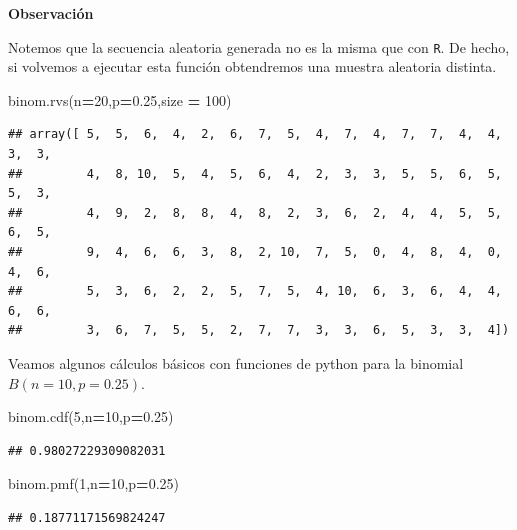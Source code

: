 \documentclass[]{book}
\newenvironment{Shaded}{\begin{snugshade}}{\end{snugshade}}
\newcommand{\DecValTok}[1]{\textcolor[rgb]{0.00,0.00,0.81}{#1}}
\newcommand{\FloatTok}[1]{\textcolor[rgb]{0.00,0.00,0.81}{#1}}
\newcommand{\NormalTok}[1]{#1}
\newcommand{\OperatorTok}[1]{\textcolor[rgb]{0.81,0.36,0.00}{\textbf{#1}}}
\begin{document}
 \textbf{Observación}

Notemos que la secuencia aleatoria generada no es la misma que con \texttt{R}. De hecho, si volvemos a ejecutar esta función obtendremos una muestra aleatoria distinta.

\begin{Shaded}
\begin{Highlighting}[]
\NormalTok{binom.rvs(n}\OperatorTok{=}\DecValTok{20}\NormalTok{,p}\OperatorTok{=}\FloatTok{0.25}\NormalTok{,size }\OperatorTok{=} \DecValTok{100}\NormalTok{)}
\end{Highlighting}
\end{Shaded}

\begin{verbatim}
## array([ 5,  5,  6,  4,  2,  6,  7,  5,  4,  7,  4,  7,  7,  4,  4,  3,  3,
##         4,  8, 10,  5,  4,  5,  6,  4,  2,  3,  3,  5,  5,  6,  5,  5,  3,
##         4,  9,  2,  8,  8,  4,  8,  2,  3,  6,  2,  4,  4,  5,  5,  6,  5,
##         9,  4,  6,  6,  3,  8,  2, 10,  7,  5,  0,  4,  8,  4,  0,  4,  6,
##         5,  3,  6,  2,  2,  5,  7,  5,  4, 10,  6,  3,  6,  4,  4,  6,  6,
##         3,  6,  7,  5,  5,  2,  7,  7,  3,  3,  6,  5,  3,  3,  4])
\end{verbatim}

Veamos algunos cálculos básicos con funciones de python para la binomial \(B(n=10,p=0.25)\).

\begin{Shaded}
\begin{Highlighting}[]
\NormalTok{binom.cdf(}\DecValTok{5}\NormalTok{,n}\OperatorTok{=}\DecValTok{10}\NormalTok{,p}\OperatorTok{=}\FloatTok{0.25}\NormalTok{)}
\end{Highlighting}
\end{Shaded}

\begin{verbatim}
## 0.98027229309082031
\end{verbatim}

\begin{Shaded}
\begin{Highlighting}[]
\NormalTok{binom.pmf(}\DecValTok{1}\NormalTok{,n}\OperatorTok{=}\DecValTok{10}\NormalTok{,p}\OperatorTok{=}\FloatTok{0.25}\NormalTok{)}
\end{Highlighting}
\end{Shaded}

\begin{verbatim}
## 0.18771171569824247
\end{verbatim}
\end{document}
